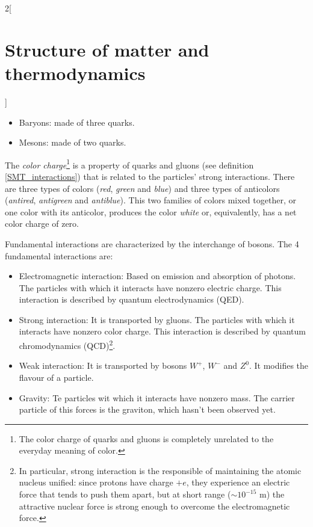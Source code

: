\documentclass[../../../main.tex]{subfiles}
\begin{document}
\begin{multicols}{2}[\section{Structure of matter and thermodynamics}]
\begin{definition}[Hadron]
\begin{itemize}
            \item Baryons: made of three quarks.
            \item Mesons: made of two quarks.
        \end{itemize}
    \end{definition}
    \begin{definition}\label{SMT_color}
        The \textit{color charge}\footnote{The color charge of quarks and gluons is completely unrelated to the everyday meaning of color.} is a property of quarks and gluons (see definition \ref{SMT_interactions}) that is related to the particles' strong interactions. There are three types of colors (\textit{red}, \textit{green} and \textit{blue}) and three types of anticolors (\textit{antired}, \textit{antigreen} and \textit{antiblue}). This two families of colors mixed together, or one color with its anticolor, produces the color \textit{white} or, equivalently, has a net color charge of zero.
    \end{definition}
    \begin{definition}\label{SMT_interactions}
        Fundamental interactions are characterized by the interchange of bosons. The 4 fundamental interactions are:
        \begin{itemize}
            \item Electromagnetic interaction: Based on emission and absorption of photons. The particles with which it interacts have nonzero electric charge. This interaction is described by quantum electrodynamics (QED).
            \item Strong interaction: It is transported by gluons. The particles with which it interacts have nonzero color charge. This interaction is described by quantum chromodynamics (QCD)\footnote{In particular, strong interaction is the responsible of maintaining the atomic nucleus unified: since protons have charge $+e$, they experience an electric force that tends to push them apart, but at short range ($\sim10^{-15}\text{ m}$) the attractive nuclear force is strong enough to overcome the electromagnetic force.}.
            \item Weak interaction: It is transported by bosons $W^+$, $W^-$ and $Z^0$. It modifies the flavour of a particle.
            \item Gravity: Te particles wit which it interacts have nonzero mass. The carrier particle of this forces is the graviton, which hasn't been observed yet.
        \end{itemize}

\end{definition}
\end{multicols}
\end{document}
